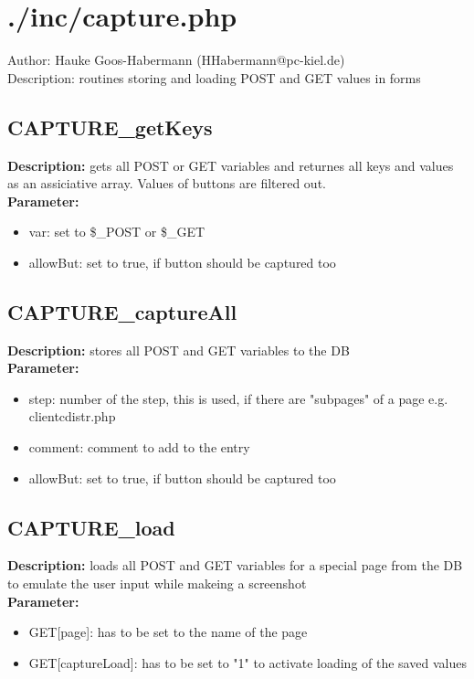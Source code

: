 \newpage\section{./inc/capture.php}
 Author: Hauke Goos-Habermann (HHabermann@pc-kiel.de)\\
 Description: routines storing and loading POST and GET values in forms\\

\subsection{CAPTURE\_getKeys}
\textbf{Description:} gets all POST or GET variables and returnes all keys and values as an assiciative array. Values of buttons are filtered out.\\
\textbf{Parameter:}
\begin{itemize}
\item var: set to \$\_POST or \$\_GET
\item allowBut: set to true, if button should be captured too
\end{itemize}

\subsection{CAPTURE\_captureAll}
\textbf{Description:} stores all POST and GET variables to the DB\\
\textbf{Parameter:}
\begin{itemize}
\item step: number of the step, this is used, if there are "subpages" of a page e.g. clientcdistr.php
\item comment: comment to add to the entry
\item allowBut: set to true, if button should be captured too
\end{itemize}

\subsection{CAPTURE\_load}
\textbf{Description:} loads all POST and GET variables for a special page from the DB to emulate the user input while makeing a screenshot\\
\textbf{Parameter:}
\begin{itemize}
\item GET[page]: has to be set to the name of the page
\item GET[captureLoad]: has to be set to "1" to activate loading of the saved values
\end{itemize}

